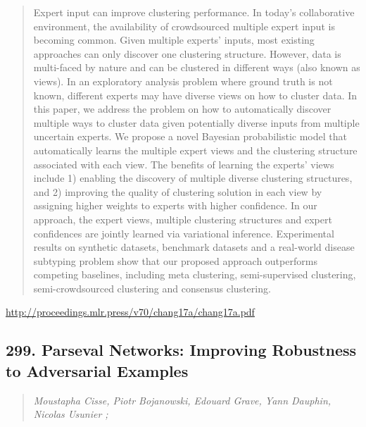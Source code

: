 \documentclass{article}
\begin{document}
\begin{quote}
    Expert input can improve clustering performance. In today’s collaborative environment, the availability of crowdsourced multiple expert input is becoming common. Given multiple experts’ inputs, most existing approaches can only discover one clustering structure. However, data is multi-faced by nature and can be clustered in different ways (also known as views). In an exploratory analysis problem where ground truth is not known, different experts may have diverse views on how to cluster data. In this paper, we address the problem on how to automatically discover multiple ways to cluster data given potentially diverse inputs from multiple uncertain experts. We propose a novel Bayesian probabilistic model that automatically learns the multiple expert views and the clustering structure associated with each view. The benefits of learning the experts’ views include 1) enabling the discovery of multiple diverse clustering structures, and 2) improving the quality of clustering solution in each view by assigning higher weights to experts with higher confidence. In our approach, the expert views, multiple clustering structures and expert confidences are jointly learned via variational inference. Experimental results on synthetic datasets, benchmark datasets and a real-world disease subtyping problem show that our proposed approach outperforms competing baselines, including meta clustering, semi-supervised clustering, semi-crowdsourced clustering and consensus clustering.  
\end{quote}

\href{http://proceedings.mlr.press/v70/chang17a/chang17a.pdf}{http://proceedings.mlr.press/v70/chang17a/chang17a.pdf}

\subsection{299. Parseval Networks: Improving Robustness to Adversarial Examples}

\begin{quote}
\footnotesize{\textit{Moustapha Cisse, Piotr Bojanowski, Edouard Grave, Yann Dauphin, Nicolas Usunier ;}}

\end{quote}
\end{document}
